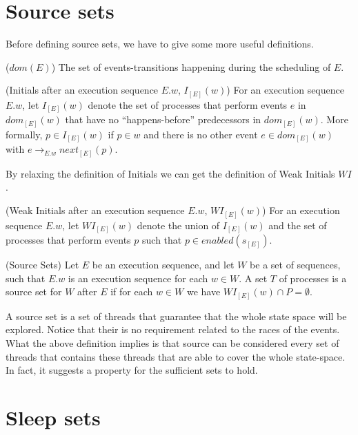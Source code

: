 
\section{Source sets}

Before defining source sets, we have to give some more useful definitions.

\begin{definition}{($dom(E)$)}
    The set of events-transitions happening during the scheduling of $E$.
\end{definition}

\begin{definition}{(Initials after an execution sequence $E.w$, $I_{[E]}(w)$)}
For an execution sequence $E.w$, let $I_{[E]}(w)$ denote the set of
processes that perform events $e$ in $dom_{[E]}(w)$ that have no
“happens-before” predecessors in $dom_{[E]}(w)$. More formally,
$p \in I_{[E]}(w)$ if $p \in w$ and there is no other event $e \in dom_{[E]}(w)$ with
$e \rightarrow_{E.w} next_{[E]}(p)$.
\end{definition}

By relaxing the definition of Initials we can get the definition of Weak Initials $WI$.

\begin{definition}{(Weak Initials after an execution sequence $E.w$, $WI_{[E]}(w)$)}
For an execution sequence $E.w$, let $WI_{[E]}(w)$ denote the union of $I_{[E]}(w)$ and the set of
processes that perform events $p$ such that $p \in enabled(s_{[E]}) $.
\end{definition}

\begin{definition}{(Source Sets)}
Let $E$ be an execution sequence,
and let $W$ be a set of sequences, such that $E.w$ is an execution
sequence for each $w \in W$. A set $T$ of processes is a source set for
$W$ after $E$ if for each $w \in W$ we have $WI_{[E]}(w) \cap P  = \emptyset$.
\end{definition}

A source set is a set of threads that guarantee that the whole state space will be explored. 
Notice that their is no requirement related to the races of the events.
What the above definition implies is that source can be considered every set of threads that contains these threads 
that are able to cover the whole state-space.
In fact, it suggests a property for the sufficient sets to hold.

\section{Sleep sets}

